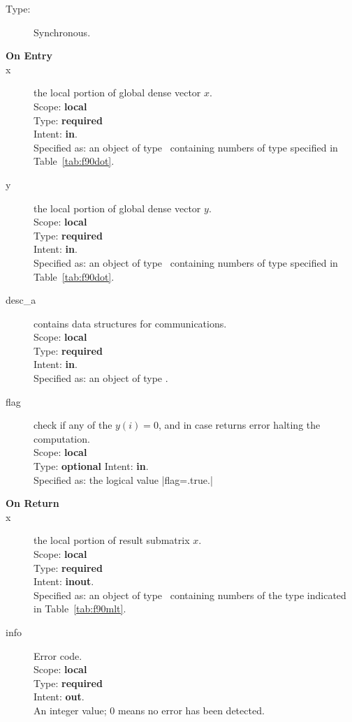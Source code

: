 \begin{description}
	\item[Type:] Synchronous.
	\item[\bf On Entry]
	\item[x] the local portion of global dense vector
	$x$.\\
	Scope: {\bf local} \\
	Type: {\bf required} \\
	Intent: {\bf in}.\\
	Specified as:  an object of type \vdata\
	containing numbers of type specified in
	Table~\ref{tab:f90dot}.
	\item[y] the local portion of global dense vector
	$y$. \\
	Scope: {\bf local} \\
	Type: {\bf required} \\
	Intent: {\bf in}.\\
	Specified as:  an object of type \vdata\
	containing numbers of type specified in
	Table~\ref{tab:f90dot}.
	\item[desc\_a] contains data structures for communications.\\
	Scope: {\bf local} \\
	Type: {\bf required}\\
	Intent: {\bf in}.\\
	Specified as: an object of type \descdata.
	\item[flag] check if any of the $y(i) = 0$, and in case returns error halting the computation.\\
	Scope: {\bf local} \\
	Type: {\bf optional}
	Intent: {\bf in}.\\
	Specified as: the logical value \fortinline|flag=.true.|
	\item[\bf On Return]
	\item[x] the local portion of result submatrix $x$.\\
	Scope: {\bf local} \\
	Type: {\bf required} \\
	Intent: {\bf inout}.\\
	Specified as: an object of type \vdata\ containing numbers of the type
	indicated in Table~\ref{tab:f90mlt}.
	\item[info] Error code.\\
	Scope: {\bf local} \\
	Type: {\bf required} \\
	Intent: {\bf out}.\\
	An integer value; 0 means no error has been detected.
\end{description}

